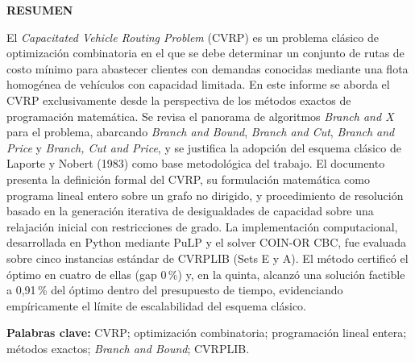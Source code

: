 \clearpage
\thispagestyle{empty}
\begin{center}
    \bfseries\fontsize{14}{16}\selectfont RESUMEN
\end{center}
\vspace{16pt}

\noindent
El \textit{Capacitated Vehicle Routing Problem} (CVRP) es un problema clásico de
optimización combinatoria en el que se debe determinar un conjunto de rutas de costo
mínimo para abastecer clientes con demandas conocidas mediante una flota homogénea de
vehículos con capacidad limitada. En este informe se aborda el CVRP
exclusivamente desde la perspectiva de los métodos exactos de programación matemática.
Se revisa el panorama de algoritmos \textit{Branch and X} para el problema, abarcando
\textit{Branch and Bound}, \textit{Branch and Cut}, \textit{Branch and Price} y
\textit{Branch, Cut and Price}, y se justifica la adopción del esquema clásico de
Laporte y Nobert (1983) como base metodológica del trabajo. El documento presenta la
definición formal del CVRP, su formulación matemática como programa lineal entero sobre
un grafo no dirigido, y procedimiento de resolución basado en la
generación iterativa de desigualdades de capacidad sobre una relajación inicial con
restricciones de grado. La implementación computacional, desarrollada en Python mediante PuLP y el
solver COIN-OR CBC, fue evaluada sobre cinco instancias estándar de CVRPLIB
(Sets E y A). El método certificó el óptimo en cuatro de ellas (gap 0\,\%) y,
en la quinta, alcanzó una solución factible a 0{,}91\,\% del óptimo dentro del
presupuesto de tiempo, evidenciando empíricamente el límite de escalabilidad
del esquema clásico.

\vspace{10pt}
\noindent\textbf{Palabras clave:} CVRP; optimización combinatoria; programación lineal
entera; métodos exactos; \textit{Branch and Bound}; CVRPLIB.